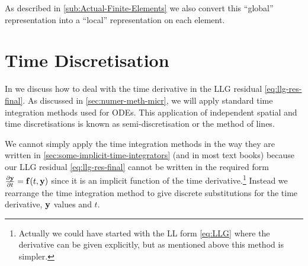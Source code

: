 As described in \cref{sub:Actual-Finite-Elements} we also convert this ``global'' representation into a ``local'' representation on each element.



\section{Time Discretisation}
\label{sec:time-discretisation-resi}

In  we discuss how to deal with the time derivative in the LLG residual \cref{eq:llg-res-final}.
As discussed in \cref{sec:numer-meth-micr}, we will apply standard time integration methods used for ODEs.
This application of independent spatial and time discretisations is known as semi-discretisation or the method of lines.

We cannot simply apply the time integration methods in the way they are written in \cref{sec:some-implicit-time-integrators} (and in most text books) because our LLG residual \cref{eq:llg-res-final} cannot be written in the required form $\frac{\partial \mathbf{y}}{\partial t} = {\mathbf{f}}(t, \mathbf{y})$ since it is an implicit function of the time derivative.\footnote{Actually we could have started with the LL form \cref{eq:LLG} where the derivative can be given explicitly, but as mentioned above this method is simpler.}
Instead we rearrange the time integration method to give discrete substitutions for the time derivative, $\mathbf{y}$ values and $t$.

